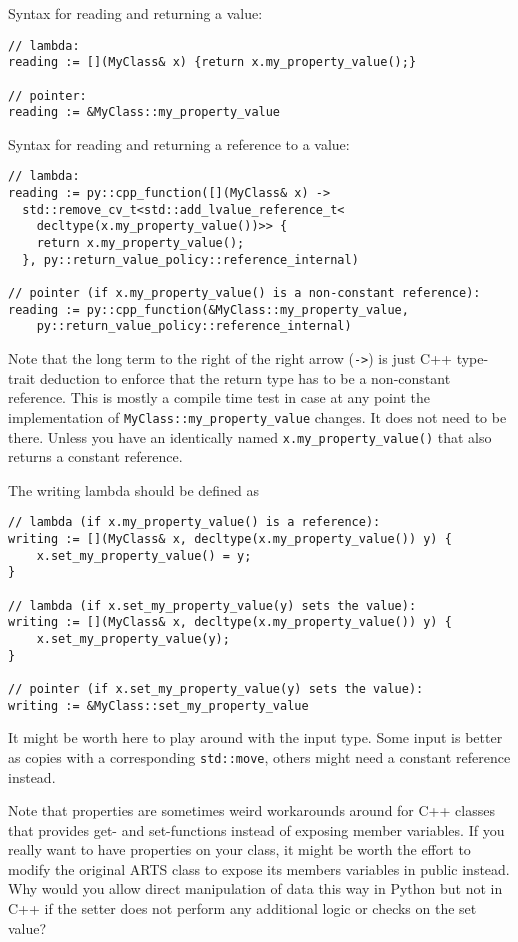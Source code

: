 Syntax for reading and returning a value:
\begin{verbatim}
// lambda:
reading := [](MyClass& x) {return x.my_property_value();}

// pointer:
reading := &MyClass::my_property_value
\end{verbatim}

Syntax for reading and returning a reference to a value:
\begin{verbatim}
// lambda:
reading := py::cpp_function([](MyClass& x) -> 
  std::remove_cv_t<std::add_lvalue_reference_t<
  	decltype(x.my_property_value())>> {
    return x.my_property_value();
  }, py::return_value_policy::reference_internal)

// pointer (if x.my_property_value() is a non-constant reference):
reading := py::cpp_function(&MyClass::my_property_value,
    py::return_value_policy::reference_internal)
\end{verbatim}
Note that the long term to the right of the right arrow (\texttt{->}) is just C++ type-trait deduction to
enforce that the return type has to be a non-constant reference.  This is mostly
a compile time test in case at any point the implementation of \texttt{MyClass::my_property_value}
changes.  It does not need to be there.  Unless you have an identically named \texttt{x.my_property_value()}
that also returns a constant reference.

The writing lambda should be defined as
\begin{verbatim}
// lambda (if x.my_property_value() is a reference):
writing := [](MyClass& x, decltype(x.my_property_value()) y) {
    x.set_my_property_value() = y;
}

// lambda (if x.set_my_property_value(y) sets the value):
writing := [](MyClass& x, decltype(x.my_property_value()) y) {
    x.set_my_property_value(y);
}

// pointer (if x.set_my_property_value(y) sets the value):
writing := &MyClass::set_my_property_value
\end{verbatim}
It might be worth here to play around with the input type.  Some input
is better as copies with a corresponding \texttt{std::move}, others might need
a constant reference instead.

Note that properties are sometimes weird workarounds around for C++ classes that provides get- and set-functions
instead of exposing member variables.  If you really want to have properties on your class, it might be worth
the effort to modify the original ARTS class to expose its members variables in public instead.  Why would you
allow direct manipulation of data this way in Python but not in C++ if the setter does not perform any additional
logic or checks on the set value?

